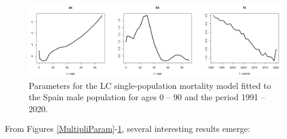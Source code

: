 \begin{figure}[h!]
\centering
\includegraphics*[width=\textwidth]{parametros_LC_male.png}
\caption{Parameters for the LC single-population mortality model fitted to the Spain male population for ages 0 – 90 and the period 1991 – 2020.}
\label{LCParam}
\end{figure}

From Figures \ref{MultipliParam}-\ref{LCParam}, several interesting results emerge:
